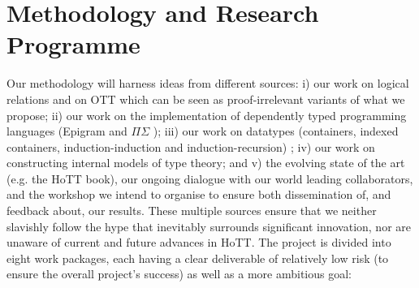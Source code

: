 \documentclass[a4paper,11pt]{article}
\begin{document}







\vspace*{-0.1in}

\section{Methodology and Research Programme}
\vspace*{-0.1in}

Our methodology will harness ideas from different sources: i) our work on logical relations and on OTT
which can be seen as proof-irrelevant variants of what we propose; ii)
our work on the implementation of dependently typed programming
languages (Epigram and $\Pi\Sigma$
\cite{alti:pisigma-new,alti:checking}); iii) our work on datatypes
(containers, indexed containers, induction-induction and
induction-recursion)
\cite{alti:fossacs03,alti:tlca03,alti:icalp04,alti:jpartial,alti:mpc04,alti:cont-tcs,alti:regular,alti:cats07,alti:jcats07,alti:lics09,
  alti:catind2}; iv) our work on constructing internal models of type
theory; and v) the evolving state of the art (e.g. the HoTT book),
our ongoing dialogue with our world leading collaborators, and the workshop we
intend to organise to ensure both dissemination of, and feedback about, our
results. These multiple sources
ensure that we neither slavishly follow the hype that inevitably
surrounds significant innovation, nor are unaware of current and
future advances in HoTT.  The project is divided into eight
work packages, each having a clear deliverable of relatively low
risk (to ensure the overall project's success) as well as a more ambitious goal:
\end{document}
